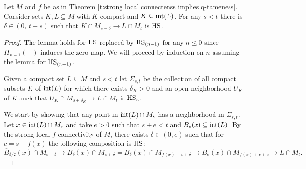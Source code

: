\begin{lem} \label{l:key lemma for q-tameness}
	Let $M$ and $f$ be as in Theorem \ref{t:strong local connectenss implies q-tameness}.
	Consider sets $K, L \subseteq M$ with $K$ compact and $K \subseteq \operatorname{int}(L)$. For any $s < t$ there is $\delta \in (0,\, t-s)$ such that $K \cap M_{s+\delta} \to L \cap M_{t}$ is $\mathrm{HS}$.
\end{lem}

\begin{proof}
	The lemma holds for $\mathrm{HS}$ replaced by $\mathrm{HS}_{(n-1)}$ for any $n \leq 0$ since $H_{n-1}(-)$ induces the zero map. We will proceed by induction on $n$ assuming the lemma for $\mathrm{HS}_{(n-1)}$. 
	
	Given a compact set $L \subseteq M$ and $s < t$ let $\Sigma_{s, t}$ be the collection of all compact subsets $K$ of $\operatorname{int}(L)$ for which there exists $\delta_K > 0$ and an open neighborhood $U_K$ of $K$ such that $U_K \cap M_{s+\delta_K} \to L \cap M_{t}$ is $\mathrm{HS}_n$.
	
	We start by showing that any point in $\operatorname{int}(L) \cap M_s$ has a neighborhood in $\Sigma_{s, t}$.
	Let $x \in \operatorname{int}(L) \cap M_{s}$ and take $e > 0$ such that $s + e < t$ and $B_e(x) \subseteq \operatorname{int}(L)$.
	By the strong local-$f$-connectivity of $M$, there exists $\delta \in (0, e)$ such that for $c = s - f(x)$ the following composition is $\mathrm{HS}$:
	\begin{equation*}
	\overline B_{\delta/2}(x) \cap M_{s + \delta} \to
	B_\delta(x) \cap M_{s + \delta} =
	B_\delta(x) \cap M_{f(x) + c + \delta} \to
	B_e(x) \cap M_{f(x) + c + e} \to
	L \cap M_{t}.
	\end{equation*}  
	

\end{proof}
